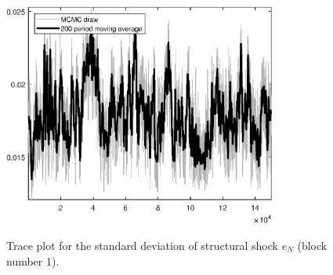 \begin{figure}[H]
\centering
  \includegraphics[width=0.8\textwidth]{BRS_gen/graphs/TracePlot_SE_e_N_blck_1}\\
    \caption{Trace plot for the standard deviation of structural shock ${e_N}$ (block number 1).}
\end{figure}
